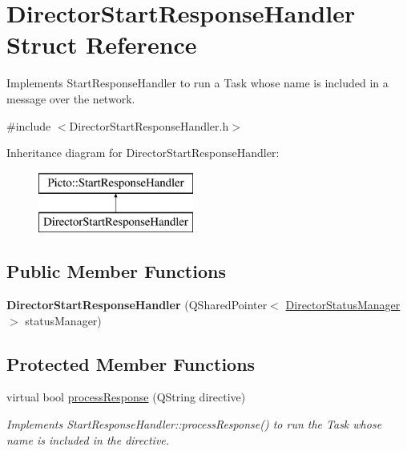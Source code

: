 \hypertarget{struct_director_start_response_handler}{\section{Director\-Start\-Response\-Handler Struct Reference}
\label{struct_director_start_response_handler}
}


Implements Start\-Response\-Handler to run a Task whose name is included in a message over the network.  




{\ttfamily \#include $<$Director\-Start\-Response\-Handler.\-h$>$}

Inheritance diagram for Director\-Start\-Response\-Handler\-:\begin{figure}[H]
\begin{center}
\leavevmode
\includegraphics[height=2.000000cm]{struct_director_start_response_handler}
\end{center}
\end{figure}
\subsection*{Public Member Functions}
\begin{DoxyCompactItemize}
\item 
\hypertarget{struct_director_start_response_handler_aa6e0a0cea4848b767166393b4425c8a6}{{\bfseries Director\-Start\-Response\-Handler} (Q\-Shared\-Pointer$<$ \hyperlink{class_director_status_manager}{Director\-Status\-Manager} $>$ status\-Manager)}\label{struct_director_start_response_handler_aa6e0a0cea4848b767166393b4425c8a6}

\end{DoxyCompactItemize}
\subsection*{Protected Member Functions}
\begin{DoxyCompactItemize}
\item 
virtual bool \hyperlink{struct_director_start_response_handler_a38a2ee3d774f0da0a2da0f539e759372}{process\-Response} (Q\-String directive)
\begin{DoxyCompactList}\small\item\em Implements Start\-Response\-Handler\-::process\-Response() to run the Task whose name is included in the directive. \end{DoxyCompactList}\end{DoxyCompactItemize}


